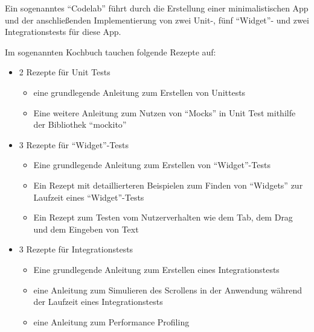 Ein sogenanntes \enquote{Codelab} führt durch die Erstellung einer minimalistischen App und der anschließenden Implementierung von zwei Unit-, fünf \enquote{Widget}- und zwei Integrationstests für diese App.

Im sogenannten Kochbuch tauchen folgende Rezepte auf:

\begin{itemize}[topsep=0pt,itemsep=-1ex,partopsep=1ex,parsep=1ex]
    \item 2 Rezepte für Unit Tests
    \begin{itemize} 
       \item eine grundlegende Anleitung zum Erstellen von Unittests 
       \item Eine weitere Anleitung zum Nutzen von \enquote{Mocks} in Unit Test mithilfe der Bibliothek \enquote{mockito} 
    \end{itemize}
    \item 3 Rezepte für \enquote{Widget}-Tests
    \begin{itemize} 
        \item Eine grundlegende Anleitung zum Erstellen von \enquote{Widget}-Tests 
        \item Ein Rezept mit detaillierteren Beispielen zum Finden von \enquote{Widgets}  zur Laufzeit eines \enquote{Widget}-Tests 
        \item Ein Rezept zum Testen vom Nutzerverhalten wie dem Tab, dem Drag und dem Eingeben von Text 
     \end{itemize}
    \item 3 Rezepte für Integrationstests
    \begin{itemize} 
        \item Eine grundlegende Anleitung zum Erstellen eines Integrationstests 
        \item eine Anleitung zum Simulieren des Scrollens in der Anwendung während der Laufzeit eines Integrationstests 
        \item eine Anleitung zum Performance Profiling 
     \end{itemize}
\end{itemize}


